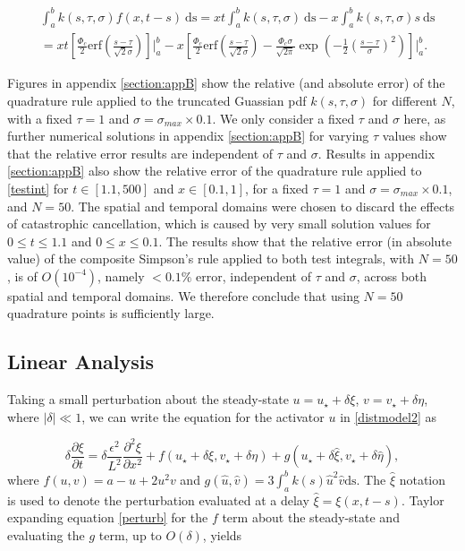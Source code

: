 \begin{equation}
    \begin{split}
&\int_a^bk(s,\tau,\sigma)f(x,t-s)\ \text{ds}=xt\int_a^bk(s,\tau,\sigma)\ \text{ds}-x\int_a^bk(s,\tau,\sigma)s\ \text{ds}\\&=xt\left[\frac{\Phi_c}{2}\text{erf}\left(\frac{s-\tau}{\sqrt{2}\sigma}\right)\right]\bigg|_a^b-x\left[\frac{\Phi_c}{2}\text{erf}\left(\frac{s-\tau}{\sqrt{2}\sigma}\right)-\frac{\Phi_c\sigma}{\sqrt{2\pi}}\exp\left(-\frac{1}{2}\left(\frac{s-\tau}{\sigma}\right)^2 \right)\right]\Bigg|_a^b.
    \end{split}
\end{equation}

Figures in appendix \ref{section:appB} show the relative (and absolute error) of the quadrature rule applied to the truncated Guassian pdf $k(s,\tau,\sigma)$ for different $N$, with a fixed $\tau=1$ and $\sigma=\sigma_{max}\times0.1$. We only consider a fixed $\tau$ and $\sigma$ here, as further numerical solutions in appendix \ref{section:appB} for varying $\tau$ values show that the relative error results are independent of $\tau$ and $\sigma$. Results in appendix \ref{section:appB} also show the relative error of the quadrature rule applied to \eqref{testint} for $t\in[1.1,500]$ and $x\in[0.1,1]$, for a fixed $\tau=1$ and $\sigma=\sigma_{max}\times0.1$, and $N=50$. The spatial and temporal domains were chosen to discard the effects of catastrophic cancellation, which is caused by very small solution values for $0\leq t\leq 1.1$ and $0\leq x\leq 0.1$. The results show that the relative error (in absolute value) of the composite Simpson's rule applied to both test integrals, with $N=50$, is of $O(10^{-4})$, namely $<0.1\%$ error, independent of $\tau$ and $\sigma$, across both spatial and temporal domains. We therefore conclude that using $N=50$ quadrature points is sufficiently large.


\subsection{Linear Analysis}\label{section:distlin}
Taking a small perturbation about the steady-state $u=u_\star+\delta\xi$, $v=v_\star+\delta\eta$, where $|\delta|\ll1$, we can write the equation for the activator $u$ in \eqref{distmodel2} as

\begin{equation}\label{perturb}
  \delta\frac{\partial \xi}{\partial t}=\delta \frac{\epsilon^2}{L^2}\frac{\partial^2\xi}{\partial x^2}+f(u_\star+\delta\xi, v_\star+\delta\eta)+g(u_\star+\delta\hat{\xi},v_\star+\delta\hat{\eta}) ,
\end{equation}
where $f(u,v)=a-u+2u^2v$ and $g(\hat{u},\hat{v})=3\int_a^bk(s)\hat{u}^2\hat{v} \text{ds}$. The $\hat{\xi}$ notation is used to denote the perturbation evaluated at a delay $\hat{\xi}=\xi(x,t-s)$. Taylor expanding equation \eqref{perturb} for the $f$ term about the steady-state and evaluating the $g$ term, up to $O(\delta)$, yields

